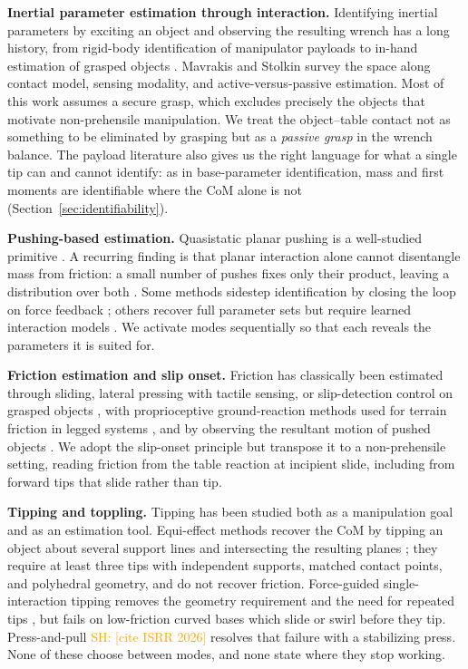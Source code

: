 \documentclass[10pt, conference]{IEEEtran}
\newcommand{\sh}[1]{\textcolor{orange}{SH: #1}}
\newcommand{\isrr}{\sh{[cite ISRR 2026]}}
\newcommand{\iros}{\cite{hyland_before_2026}}
\begin{document}
\noindent \textbf{Inertial parameter estimation through interaction.} Identifying inertial parameters by exciting an object and observing the resulting wrench has a long history, from rigid-body identification of manipulator payloads \cite{atkeson_rigid_1985, khosla_parameter_1985} to in-hand estimation of grasped objects \cite{kubus_-line_2007, sundaralingam_-hand_2021}. Mavrakis and Stolkin \cite{mavrakis_estimation_2020} survey the space along contact model, sensing modality, and active-versus-passive estimation. Most of this work assumes a secure grasp, which excludes precisely the objects that motivate non-prehensile manipulation. We treat the object--table contact not as something to be eliminated by grasping but as a \emph{passive grasp} in the wrench balance. The payload literature also gives us the right language for what a single tip can and cannot identify: as in base-parameter identification, mass and first moments are identifiable where the CoM alone is not (Section~\ref{sec:identifiability}).

\noindent \textbf{Pushing-based estimation.} Quasistatic planar pushing is a well-studied primitive \cite{mason_mechanics_1986, lynch_estimating_1993, bauza_probabilistic_2017}. A recurring finding is that planar interaction alone cannot disentangle mass from friction: a small number of pushes fixes only their product, leaving a distribution over both \cite{bauza_probabilistic_2017}. Some methods sidestep identification by closing the loop on force feedback \cite{heins_force_2024}; others recover full parameter sets but require learned interaction models \cite{dutta_push_2023}. We activate modes sequentially so that each reveals the parameters it is suited for.

\noindent \textbf{Friction estimation and slip onset.} Friction has classically been estimated through sliding, lateral pressing with tactile sensing, or slip-detection control on grasped objects \cite{sundaralingam_-hand_2021}, with proprioceptive ground-reaction methods used for terrain friction in legged systems \cite{kim_online_2025}, and by observing the resultant motion of pushed objects \cite{lynch_estimating_1993}. We adopt the slip-onset principle but transpose it to a non-prehensile setting, reading friction from the table reaction at incipient slide, including from forward tips that slide rather than tip.

\noindent \textbf{Tipping and toppling.} Tipping has been studied both as a manipulation goal and as an estimation tool. Equi-effect methods recover the CoM by tipping an object about several support lines and intersecting the resulting planes \cite{yong_yu_estimation_1999, yong_yu_estimation_2001, yong_yu_estimation_2005}; they require at least three tips with independent supports, matched contact points, and polyhedral geometry, and do not recover friction. Force-guided single-interaction tipping removes the geometry requirement and the need for repeated tips \iros{}, but fails on low-friction curved bases which slide or swirl before they tip. Press-and-pull \isrr{} resolves that failure with a stabilizing press. None of these choose between modes, and none state where they stop working.
\end{document}
